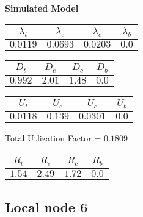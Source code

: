 \documentclass{article}
\begin{document}
\begin{minipage}{0.5\textwidth}
\centering	\textbf{Simulated Model}
\begin{table}[H]
\centering
\begin{tabular}{@{}cccc@{}}
\toprule
$\lambda_t$ & $\lambda_e$ & $\lambda_c$ & $\lambda_b$\\
\midrule
$0.0119$ & $0.0693$ & $0.0203$ & $0.0$\\
\bottomrule
\end{tabular}
\end{table}
\begin{table}[H]
\centering
\begin{tabular}{@{}cccc@{}}
\toprule
$D_t$ & $D_e$ & $D_c$ & $D_b$\\
\midrule
$0.992$ & $2.01$ & $1.48$ & $0.0$\\
\bottomrule
\end{tabular}
\end{table}\begin{table}[H]
\centering
\begin{tabular}{@{}cccc@{}}
\toprule
$U_t$ & $U_e$ & $U_c$ & $U_b$\\
\midrule
$0.0118$ & $0.139$ & $0.0301$ & $0.0$\\
\bottomrule
\end{tabular}
\end{table}
\centering Total Utlization Factor = $0.1809$
\begin{table}[H]
\centering
\begin{tabular}{@{}cccc@{}}
\toprule
$R_t$ & $R_e$ & $R_c$ & $R_b$\\
\midrule
$1.54$ & $2.49$ & $1.72$ & $0.0$\\
\bottomrule
\end{tabular}
\end{table}
\end{minipage}\subsection{Local node 6}
\end{document}
